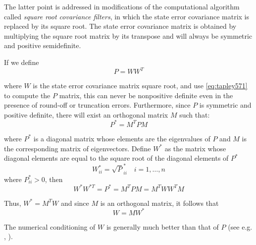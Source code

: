 The latter point is addressed in modifications of the computational algorithm called 
\emph{square root covariance filters}, in which the state error covariance matrix is 
replaced by its square root. The state error covariance matrix is obtained by
multiplying the square root matrix by its transpose and will always be symmetric
and positive semidefinite.

If we define
\begin{equation}
\label{eq:tapley571}
P = W W^T
\end{equation}

where \(W\) is the state error covariance matrix square root, and use \ref{eq:tapley571} to 
compute the \(P\) matrix, this can never be nonpositive definite even in the presence 
of round-off or truncation errors. Furthermore, since \(P\) is symmetric and positive 
definite, there will exist an orthogonal matrix \(M\) such that:
\begin{equation}
\label{eq:tapley572}
  P^* = M^T P M
\end{equation}

where \(P^*\) is a diagonal matrix whose elements are the eigenvalues of \(P\) and 
\(M\) is the corresponding matrix of eigenvectors. Define \(W^*\) as the matrix 
whose diagonal elements are equal to the square root of the diagonal elements of \(P^*\)
\begin{equation}
  W^*_{ii} = \sqrt P^*_{ii} \quad i=1,\ldots ,n
\end{equation}
where \(P^*_{ii} > 0\), then
\begin{equation}
 W^* W^{*T} = P^* = M^T P M = M^T W W^T M
\end{equation}

Thus, \(W^* = M^T W \) and since \(M\) is an orthogonal matrix, it follows that
\begin{equation}
  \label{eq:tapley574}
  W = M W^*
\end{equation}

The numerical conditioning of \(W\) is generally much better than that of \(P\) (see 
e.g. \cite{lawson1995}, \cite{tapley}).
